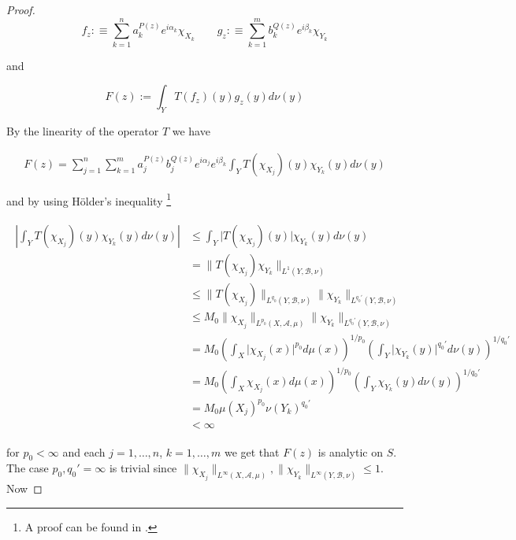 \begin{proof}
				\begin{equation}
					f_z :\equiv \sum_{k = 1}^n a^{P(z)}_k e^{i\alpha_k}\chi_{X_k} \qquad g_z :\equiv  \sum_{k = 1}^m b^{Q(z)}_k e^{i\beta_k}\chi_{Y_k}
					\label{def:fzgz}
				\end{equation}
				
				and 

				\begin{equation}
					F(z) := \int_Y T(f_z)(y)g_z(y)d\nu(y)
				\end{equation}

				By the linearity of the operator $T$ we have

				\begin{gather}
					F(z) = \sum_{j = 1}^n\sum_{k = 1}^m a^{P(z)}_j b_j^{Q(z)} e^{i\alpha_j} e^{i\beta_k} \int_YT(\chi_{X_j})(y)\chi_{Y_k}(y)d\nu(y) 
				\end{gather}

				and by using H\"older's inequality \footnote{A proof can be found in \cite[223]{elstrodt:mass:2011}.}

				\begin{gather}
					\begin{aligned}
						\left\vert \int_YT(\chi_{X_j})(y)\chi_{Y_k}(y)d\nu(y) \right\vert &\leqslant \int_Y\vert T(\chi_{X_j})(y)\vert \chi_{Y_k}(y)d\nu(y)\\
						&= \|T(\chi_{X_j})\chi_{Y_k}\|_{L^1(Y,\mathcal{B},\nu)}\\
						&\leqslant \|T(\chi_{X_j})\|_{L^{q_0}(Y,\mathcal{B},\nu)} \|\chi_{Y_k}\|_{L^{q_0'}(Y,\mathcal{B},\nu)}\\
						&\leqslant M_0\|\chi_{X_j}\|_{L^{p_0}(X,\mathcal{A},\mu)} \|\chi_{Y_k}\|_{L^{q_0'}(Y,\mathcal{B},\nu)}\\
						&= M_0 \left(\int_X \vert \chi_{X_j}(x) \vert^{p_0}d\mu(x)\right)^{1/{p_0}} \left( \int_Y \vert\chi_{Y_k}(y)\vert^{q_0'}d\nu(y) \right)^{1/{q_0'}}\\
						&=  M_0 \left(\int_X \chi_{X_j}(x) d\mu(x)\right)^{1/{p_0}} \left( \int_Y \chi_{Y_k}(y)d\nu(y) \right)^{1/{q_0'}}\\
						&= M_0 \mu(X_j)^{p_0} \nu(Y_k)^{q_0'}\\
						&< \infty
					\end{aligned}
				\end{gather}

				for $p_0 < \infty$ and each $j = 1,\hdots,n$, $k = 1,\hdots,m$ we get that $F(z)$ is analytic on $S$. The case $p_0,q_0' = \infty$ is trivial since $\|\chi_{X_j}\|_{L^\infty(X,\mathcal{A},\mu)},\|\chi_{Y_k}\|_{L^\infty(Y,\mathcal{B},\nu)}  \leqslant 1$. Now


\end{proof}
